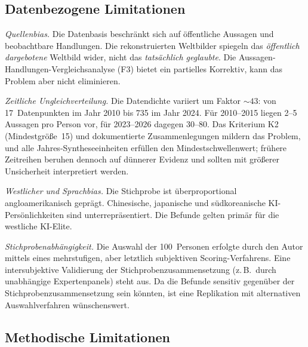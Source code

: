 \documentclass[12pt,a4paper]{article}
\begin{document}
\subsection{Datenbezogene Limitationen}

\emph{Quellenbias.} Die Datenbasis beschränkt sich auf öffentliche Aussagen und beobachtbare Handlungen. Die rekonstruierten Weltbilder spiegeln das \emph{öffentlich dargebotene} Weltbild wider, nicht das \emph{tatsächlich geglaubte}. Die Aussagen-Handlungen-Vergleichsanalyse (F3) bietet ein partielles Korrektiv, kann das Problem aber nicht eliminieren.

\emph{Zeitliche Ungleichverteilung.} Die Datendichte variiert um Faktor ${\sim}43$: von 17~Datenpunkten im Jahr 2010 bis 735 im Jahr 2024. Für 2010--2015 liegen 2--5 Aussagen pro Person vor, für 2023--2026 dagegen 30--80. Das Kriterium K2 (Mindestgröße~15) und dokumentierte Zusammenlegungen mildern das Problem, und alle Jahres-Syntheseeinheiten erfüllen den Mindestschwellenwert; frühere Zeitreihen beruhen dennoch auf dünnerer Evidenz und sollten mit größerer Unsicherheit interpretiert werden.

\emph{Westlicher und Sprachbias.} Die Stichprobe ist überproportional angloamerikanisch geprägt. Chinesische, japanische und südkoreanische KI-Persönlichkeiten sind unterrepräsentiert. Die Befunde gelten primär für die westliche KI-Elite.

\emph{Stichprobenabhängigkeit.} Die Auswahl der 100~Personen erfolgte durch den Autor mittels eines mehrstufigen, aber letztlich subjektiven Scoring-Verfahrens. Eine intersubjektive Validierung der Stichprobenzusammensetzung (z.\,B.\ durch unabhängige Expertenpanels) steht aus. Da die Befunde sensitiv gegenüber der Stichprobenzusammensetzung sein könnten, ist eine Replikation mit alternativen Auswahlverfahren wünschenswert.


\subsection{Methodische Limitationen}
\end{document}
